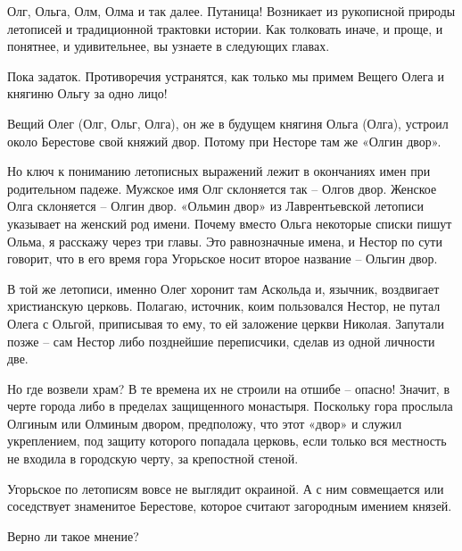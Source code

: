 Олг, Ольга, Олм, Олма и так далее. Путаница! Возникает из рукописной природы летописей и традиционной трактовки истории. Как толковать иначе, и проще, и понятнее, и удивительнее, вы узнаете в следующих главах. 

Пока задаток. Противоречия устранятся, как только мы примем Вещего Олега и княгиню Ольгу за одно лицо!

Вещий Олег (Олг, Ольг, Олга), он же в будущем княгиня Ольга (Олга), устроил около Берестове свой княжий двор. Потому при Несторе там же «Олгин двор».


Но ключ к пониманию летописных выражений лежит в окончаниях имен при родительном падеже. Мужское имя Олг склоняется так – Олгов двор. Женское Олга склоняется – Олгин двор. «Ольмин двор» из Лаврентьевской летописи указывает на женский род имени. Почему вместо Ольга некоторые списки пишут Ольма, я расскажу через три главы. Это равнозначные имена, и Нестор по сути говорит, что в его время гора Угорьское носит второе название – Ольгин двор.

В той же летописи, именно Олег хоронит там Аскольда и, язычник, воздвигает христианскую церковь. Полагаю, источник, коим пользовался Нестор, не путал Олега с Ольгой, приписывая то ему, то ей заложение церкви Николая. Запутали позже – сам Нестор либо позднейшие переписчики, сделав из одной личности две.

Но где возвели храм? В те времена их не строили на отшибе – опасно! Значит, в черте города либо в пределах защищенного монастыря. Поскольку гора прослыла Олгиным или Олминым двором, предположу, что этот «двор» и служил укреплением, под защиту которого попадала церковь, если только вся местность не входила в городскую черту, за крепостной стеной.

Угорьское по летописям вовсе не выглядит окраиной. А с ним совмещается или соседствует знаменитое Берестове, которое считают загородным имением князей. 

Верно ли такое мнение?
